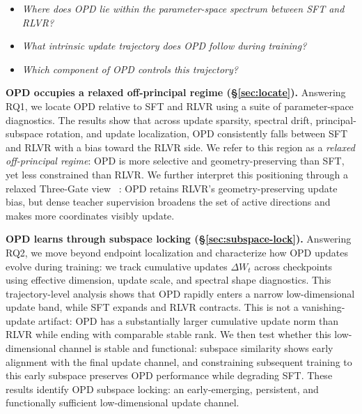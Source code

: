 \documentclass{llmxive}
\begin{document}



\begin{tcolorbox}[
    colback=white!2,
    colframe=white!15,
    boxrule=0pt,
    arc=5pt,
    left=5pt,right=5pt,top=1pt,bottom=2pt
]
\begin{itemize}[leftmargin=1.8em,itemsep=2pt,topsep=2pt]
    \item[\textbf{RQ1}] \emph{Where does OPD lie within the parameter-space spectrum between SFT and RLVR?}
    \item[\textbf{RQ2}] \emph{What intrinsic update trajectory does OPD follow during training?}
    \item[\textbf{RQ3}] \emph{Which component of OPD controls this trajectory?}
\end{itemize}
\vspace{-1em}
\end{tcolorbox}

\textbf{OPD occupies a relaxed off-principal regime
(\S\ref{sec:locate}).}
Answering RQ1, we locate OPD relative to SFT and RLVR using a suite of
parameter-space diagnostics. The results show that across update sparsity, spectral drift, principal-subspace rotation, and update localization, OPD consistently falls between SFT and RLVR with a  bias toward the RLVR side. We refer to this region as a \emph{relaxed off-principal regime}: OPD is more selective and geometry-preserving than SFT, yet less constrained than RLVR. We further interpret this positioning through a relaxed Three-Gate view ~\cite{zhu2025pnt}: OPD retains RLVR's geometry-preserving update bias, but dense teacher supervision broadens the set of active directions and makes more coordinates visibly update.

\textbf{OPD learns through subspace locking
(\S\ref{sec:subspace-lock}).}
Answering RQ2, we move beyond endpoint localization and characterize how
OPD updates evolve during training: we track cumulative updates
$\Delta W_t$ across checkpoints using effective dimension, update scale,
and spectral shape diagnostics. This trajectory-level analysis shows that
OPD rapidly enters a narrow low-dimensional update band, while SFT expands and RLVR contracts. This is not a vanishing-update artifact: OPD has a substantially larger cumulative update norm than RLVR while ending with comparable stable rank. We then test whether this low-dimensional channel is stable and functional: subspace similarity shows early alignment with the final update channel, and constraining subsequent training to this early subspace preserves OPD performance while degrading SFT. These results identify OPD subspace locking: an early-emerging, persistent, and functionally sufficient low-dimensional update channel.
\end{document}
